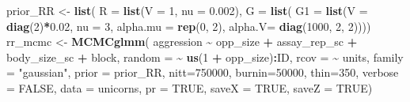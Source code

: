 \documentclass[
  12pt,
]{book}
\newenvironment{Shaded}{\begin{snugshade}}{\end{snugshade}}
\newcommand{\DataTypeTok}[1]{\textcolor[rgb]{0.13,0.29,0.53}{#1}}
\newcommand{\DecValTok}[1]{\textcolor[rgb]{0.00,0.00,0.81}{#1}}
\newcommand{\FloatTok}[1]{\textcolor[rgb]{0.00,0.00,0.81}{#1}}
\newcommand{\KeywordTok}[1]{\textcolor[rgb]{0.13,0.29,0.53}{\textbf{#1}}}
\newcommand{\NormalTok}[1]{#1}
\newcommand{\OperatorTok}[1]{\textcolor[rgb]{0.81,0.36,0.00}{\textbf{#1}}}
\newcommand{\OtherTok}[1]{\textcolor[rgb]{0.56,0.35,0.01}{#1}}
\newcommand{\StringTok}[1]{\textcolor[rgb]{0.31,0.60,0.02}{#1}}
\begin{document}
\begin{Shaded}
\begin{Highlighting}[]
\NormalTok{prior\_RR \textless{}{-}}\StringTok{ }\KeywordTok{list}\NormalTok{(}
  \DataTypeTok{R =} \KeywordTok{list}\NormalTok{(}\DataTypeTok{V =} \DecValTok{1}\NormalTok{, }\DataTypeTok{nu =} \FloatTok{0.002}\NormalTok{),}
  \DataTypeTok{G =} \KeywordTok{list}\NormalTok{(}
    \DataTypeTok{G1 =} \KeywordTok{list}\NormalTok{(}\DataTypeTok{V =} \KeywordTok{diag}\NormalTok{(}\DecValTok{2}\NormalTok{)}\OperatorTok{*}\FloatTok{0.02}\NormalTok{, }\DataTypeTok{nu =} \DecValTok{3}\NormalTok{,}
\DataTypeTok{alpha.mu =} \KeywordTok{rep}\NormalTok{(}\DecValTok{0}\NormalTok{, }\DecValTok{2}\NormalTok{),}
\DataTypeTok{alpha.V=} \KeywordTok{diag}\NormalTok{(}\DecValTok{1000}\NormalTok{, }\DecValTok{2}\NormalTok{, }\DecValTok{2}\NormalTok{))))}
\NormalTok{rr\_mcmc \textless{}{-}}\StringTok{ }\KeywordTok{MCMCglmm}\NormalTok{(}
\NormalTok{  aggression }\OperatorTok{\textasciitilde{}}\StringTok{ }\NormalTok{opp\_size }\OperatorTok{+}\StringTok{ }\NormalTok{assay\_rep\_sc }\OperatorTok{+}\StringTok{ }\NormalTok{body\_size\_sc }\OperatorTok{+}\StringTok{ }\NormalTok{block,}
  \DataTypeTok{random =} \OperatorTok{\textasciitilde{}}\StringTok{ }\KeywordTok{us}\NormalTok{(}\DecValTok{1} \OperatorTok{+}\StringTok{ }\NormalTok{opp\_size)}\OperatorTok{:}\NormalTok{ID,}
  \DataTypeTok{rcov =} \OperatorTok{\textasciitilde{}}\StringTok{ }\NormalTok{units,}
\DataTypeTok{family =} \StringTok{"gaussian"}\NormalTok{,}
\DataTypeTok{prior =}\NormalTok{ prior\_RR,}
\DataTypeTok{nitt=}\DecValTok{750000}\NormalTok{,}
\DataTypeTok{burnin=}\DecValTok{50000}\NormalTok{,}
\DataTypeTok{thin=}\DecValTok{350}\NormalTok{,}
\DataTypeTok{verbose =} \OtherTok{FALSE}\NormalTok{,}
\DataTypeTok{data =}\NormalTok{ unicorns,}
\DataTypeTok{pr =} \OtherTok{TRUE}\NormalTok{,}
\DataTypeTok{saveX =} \OtherTok{TRUE}\NormalTok{, }\DataTypeTok{saveZ =} \OtherTok{TRUE}\NormalTok{)}
\end{Highlighting}
\end{Shaded}

\begin{Shaded}
\end{Shaded}
\end{document}
